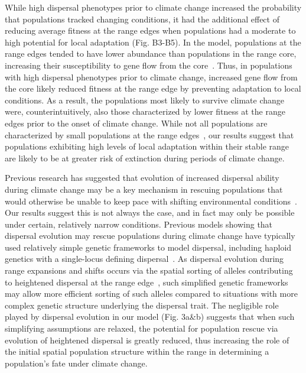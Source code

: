 \documentclass[12pt, oneside]{article}
\begin{document}
While high dispersal phenotypes prior to climate change increased the probability that populations tracked changing conditions, it had the additional effect of reducing average fitness at the range edges when populations had a moderate to high potential for local adaptation (Fig. B3-B5). In the model, populations at the range edges tended to have lower abundance than populations in the range core, increasing their susceptibility to gene flow from the core~\citep{lenormand2002gene}. Thus, in populations with high dispersal phenotypes prior to climate change, increased gene flow from the core likely reduced fitness at the range edge by preventing adaptation to local conditions. As a result, the populations most likely to survive climate change were, counterintuitively, also those characterized by lower fitness at the range edges prior to the onset of climate change. While not all populations are characterized by small populations at the range edges~\citep{dallas2017species}, our results suggest that populations exhibiting high levels of local adaptation within their stable range are likely to be at greater risk of extinction during periods of climate change.

Previous research has suggested that evolution of increased dispersal ability during climate change may be a key mechanism in rescuing populations that would otherwise be unable to keep pace with shifting environmental conditions~\citep{boeye2013more}. Our results suggest this is not always the case, and in fact may only be possible under certain, relatively narrow conditions. Previous models showing that dispersal evolution may rescue populations during climate change have typically used relatively simple genetic frameworks to model dispersal, including haploid genetics with a single-locus defining dispersal~\citep{boeye2013more, hargreaves2015fitness}. As dispersal evolution during range expansions and shifts occurs via the spatial sorting of alleles contributing to heightened dispersal at the range edge~\citep{shine2011evolutionary}, such simplified genetic frameworks may allow more efficient sorting of such alleles compared to situations with more complex genetic structure underlying the dispersal trait. The negligible role played by dispersal evolution in our model (Fig. 3a\&b) suggests that when such simplifying assumptions are relaxed, the potential for population rescue via evolution of heightened dispersal is greatly reduced, thus increasing the role of the initial spatial population structure within the range in determining a population's fate under climate change.
\end{document}

